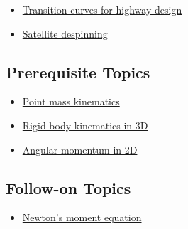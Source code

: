\documentclass{article}
\begin{document}
\begin{itemize}
\item \href{transition_curves}{Transition curves for highway design}
\item \href{satellite_despin}{Satellite despinning}
\end{itemize}

\subsection{Prerequisite Topics}

\begin{itemize}
\item \href{point_mass_kinematics}{Point mass kinematics}
\item \href{rigid_body_kinematics_3d}{Rigid body kinematics in 3D}
\item \href{angular_momentum_2d}{Angular momentum in 2D}
\end{itemize}

\subsection{Follow-on Topics}

\begin{itemize}
\item \href{newtons_eqn_moment}{Newton's moment equation}
\end{itemize}
\end{document}
